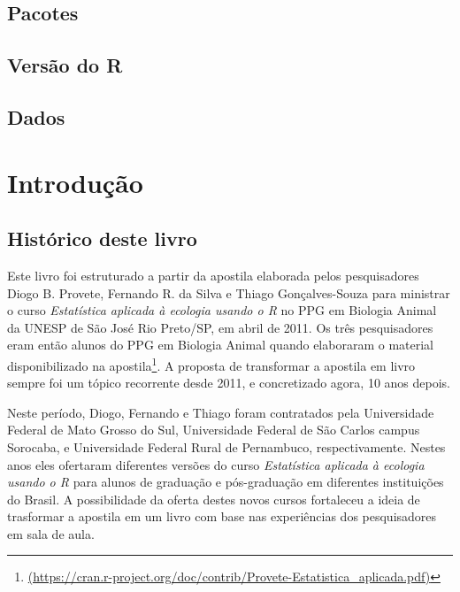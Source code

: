 \documentclass[
]{book}
\renewcommand{\href}[2]{#2\footnote{\url{#1}}}
\begin{document}
\hypertarget{pacotes}{%
\section{Pacotes}\label{pacotes}}

\hypertarget{versuxe3o-do-r}{%
\section{Versão do R}\label{versuxe3o-do-r}}

\hypertarget{dados}{%
\section{Dados}\label{dados}}

\hypertarget{cap2}{%
\chapter{Introdução}\label{cap2}}

\hypertarget{histuxf3rico-deste-livro}{%
\section{Histórico deste livro}\label{histuxf3rico-deste-livro}}

Este livro foi estruturado a partir da apostila elaborada pelos pesquisadores Diogo B. Provete, Fernando R. da Silva e Thiago Gonçalves-Souza para ministrar o curso \emph{Estatística aplicada à ecologia usando o R} no PPG em Biologia Animal da UNESP de São José Rio Preto/SP, em abril de 2011. Os três pesquisadores eram então alunos do PPG em Biologia Animal quando elaboraram o material disponibilizado na \href{(https://cran.r-project.org/doc/contrib/Provete-Estatistica_aplicada.pdf)}{apostila}. A proposta de transformar a apostila em livro sempre foi um tópico recorrente desde 2011, e concretizado agora, 10 anos depois.

Neste período, Diogo, Fernando e Thiago foram contratados pela Universidade Federal de Mato Grosso do Sul, Universidade Federal de São Carlos campus Sorocaba, e Universidade Federal Rural de Pernambuco, respectivamente. Nestes anos eles ofertaram diferentes versões do curso \emph{Estatística aplicada à ecologia usando o R} para alunos de graduação e pós-graduação em diferentes instituições do Brasil. A possibilidade da oferta destes novos cursos fortaleceu a ideia de trasformar a apostila em um livro com base nas experiências dos pesquisadores em sala de aula.
\end{document}
